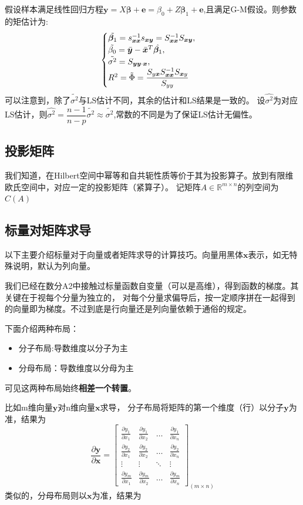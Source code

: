 \documentclass[cn,hazy,green,12pt,normal]{elegantnote}
\newcommand{\p}{\partial}
\newcommand{\MR}{\mathbb R}
\numberwithin{equation}{section}
\numberwithin{subsection}{section}
\begin{document}
\begin{example}[线性回归模型的矩估计]
    假设样本满足线性回归方程$\bm y=X\bm \beta +\bm e=\beta_0+Z\bm \beta_1+\bm e$,且满足G-M假设。则参数的矩估计为:
    \[
    \begin{cases}
        \tilde{\bm \beta_1}=s_{\bm x \bm x}^{-1}s_{\bm x\bm y}=S_{\bm x \bm x}^{-1}S_{\bm x\bm y},\\
        \tilde{\beta_0}=\Bar{\bm y}-\Bar{\bm x}^T \hat{\bm \beta_1},\\
        \tilde{\sigma^2}=S_{\bm y\bm y\cdot \bm x},\\
        R^2=\tilde{\Phi}=\dfrac{S_{y\bm x}S_{\bm x\bm x}^{-1}S_{\bm x y}}{S_{yy}}
    \end{cases}
    \]
    可以注意到，除了$\tilde{\sigma^2}$与LS估计不同，其余的估计和LS结果是一致的。
    设$\hat{\sigma^2}$为对应LS估计，则$\hat{\sigma^2}=\dfrac{n-1}{n-p}\tilde{\sigma^2}\approx \tilde{\sigma^2}$,常数的不同是为了保证LS估计无偏性。
\end{example}

\subsection{投影矩阵}
我们知道，在Hilbert空间中幂等和自共轭性质等价于其为投影算子。放到有限维欧氏空间中，对应一定的投影矩阵（紧算子）。
记矩阵$A\in \MR^{m\times n}$的列空间为$C(A)$
\subsection[标量对矩阵求导]{标量对矩阵求导\cite{cn1}}
以下主要介绍标量对于向量或者矩阵求导的计算技巧。向量用黑体$\bm x$表示，如无特殊说明，默认为列向量。

我们已经在数分A2中接触过标量函数自变量（可以是高维），得到函数的梯度。其关键在于视每个分量为独立的，
对每个分量求偏导后，按一定顺序拼在一起得到的向量即为梯度。不过到底是行向量还是列向量依赖于通俗的规定。

下面介绍两种布局：
\begin{itemize}
    \item 分子布局:导数维度以分子为主
    \item 分母布局：导数维度以分母为主
\end{itemize}
可见这两种布局始终\textbf{相差一个转置}。

比如m维向量$\bm y$对n维向量$\bm x$求导，
分子布局将矩阵的第一个维度（行）以分子$\bm y$为准，结果为
\[
\frac{\p \bm y}{\p \bm x} = \begin{bmatrix}
\frac{\p y_1}{\p x_1} &\frac{\p y_1}{\p x_2}  & \dotsc  & \frac{\p y_1}{\p x_n} \\
 \frac{\p y_2}{\p x_1}&\frac{\p y_2}{\p x_2}  &\dotsc  & \frac{\p y_2}{\p x_n}\\
\vdots  & \vdots  & \ddots  & \vdots \\
\frac{\p y_m}{\p x_1} & \frac{\p y_m}{\p x_2}  & \dotsc  & \frac{\p y_m}{\p x_n}
\end{bmatrix}_{(m\times n)}
\]
类似的，分母布局则以$\bm x$为准，结果为
\end{document}
